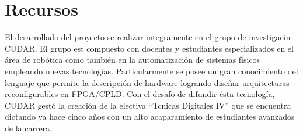 \documentclass[10pt,a4paper,titlepage,spanish]{article}
\begin{document}
\section{Recursos}

El desarrollado del proyecto se realizar integramente en el grupo de investigacin CUDAR. El grupo est compuesto con docentes y estudiantes especializados en el área de robótica como también en la automatización de sistemas físicos empleando nuevas tecnologías. Particularmente se posee un gran conocimiento del lenguaje que permite la descripción
de hardware logrando diseñar arquitecturas reconfigurables en FPGA/CPLD.
Con el desafo de difundir ésta tecnología, CUDAR gestó la creación de la electiva \textquotedblleft{}Tcnicas Digitales IV\textquotedblright{} que se encuentra dictando ya hace cinco años con un alto acaparamiento de estudiantes avanzados de la carrera.

\end{document}
